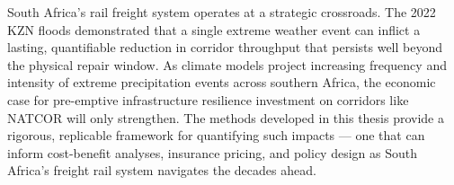 South Africa's rail freight system operates at a strategic crossroads.
The 2022 KZN floods demonstrated that a single extreme weather event
can inflict a lasting, quantifiable reduction in corridor throughput
that persists well beyond the physical repair window.
As climate models project increasing frequency and intensity of
extreme precipitation events across southern Africa, the economic
case for pre-emptive infrastructure resilience investment on corridors
like NATCOR will only strengthen.
The methods developed in this thesis provide a rigorous, replicable
framework for quantifying such impacts --- one that can inform
cost-benefit analyses, insurance pricing, and policy design as
South Africa's freight rail system navigates the decades ahead.
